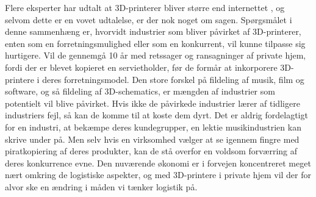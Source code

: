 Flere eksperter har udtalt at 3D-printerer bliver større end internettet \autocite{financial_times_3d_2012}, og selvom dette er en vovet udtalelse, er der nok noget om sagen. Spørgsmålet i denne sammenhæng er, hvorvidt industrier som bliver påvirket af 3D-printerer, enten som en forretningsmulighed eller som en konkurrent, vil kunne tilpasse sig hurtigere. Vil de gennemgå 10 år med retssager og ransagninger af private hjem, fordi der er blevet kopieret en servietholder, før de formår at inkorporere 3D-printere i deres forretningsmodel.
Den store forskel på fildeling af musik, film og software, og så fildeling af 3D-schematics, er mængden af industrier som potentielt vil blive påvirket. Hvis ikke de påvirkede industrier lærer af tidligere industriers fejl, så kan de komme til at koste dem dyrt. Det er aldrig fordelagtigt for en industri, at bekæmpe deres kundegrupper, en lektie musikindustrien kan skrive under på. Men selv hvis en virksomhed vælger at se igennem fingre med piratkopiering af deres produkter, kan de stå overfor en voldsom forværring af deres konkurrence evne.
Den nuværende økonomi er i forvejen koncentreret meget nært omkring de logistiske aspekter, og med 3D-printere i private hjem vil der for alvor ske en ændring i måden vi tænker logistik på.
